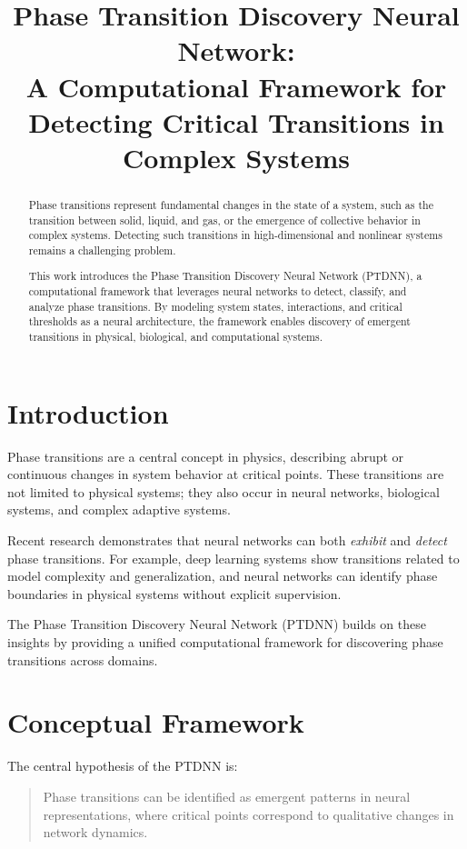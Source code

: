 \documentclass[12pt]{article}
\title{\textbf{Phase Transition Discovery Neural Network: \\ A Computational Framework for Detecting Critical Transitions in Complex Systems}}
\author{}
\date{}
\begin{document}
\maketitle

\begin{abstract}
Phase transitions represent fundamental changes in the state of a system, such as the transition between solid, liquid, and gas, or the emergence of collective behavior in complex systems. Detecting such transitions in high-dimensional and nonlinear systems remains a challenging problem.

This work introduces the Phase Transition Discovery Neural Network (PTDNN), a computational framework that leverages neural networks to detect, classify, and analyze phase transitions. By modeling system states, interactions, and critical thresholds as a neural architecture, the framework enables discovery of emergent transitions in physical, biological, and computational systems.
\end{abstract}

\section{Introduction}

Phase transitions are a central concept in physics, describing abrupt or continuous changes in system behavior at critical points. These transitions are not limited to physical systems; they also occur in neural networks, biological systems, and complex adaptive systems.

Recent research demonstrates that neural networks can both \textit{exhibit} and \textit{detect} phase transitions. For example, deep learning systems show transitions related to model complexity and generalization, and neural networks can identify phase boundaries in physical systems without explicit supervision.

The Phase Transition Discovery Neural Network (PTDNN) builds on these insights by providing a unified computational framework for discovering phase transitions across domains.

\section{Conceptual Framework}

The central hypothesis of the PTDNN is:

\begin{quote}
Phase transitions can be identified as emergent patterns in neural representations, where critical points correspond to qualitative changes in network dynamics.
\end{quote}
\end{document}
